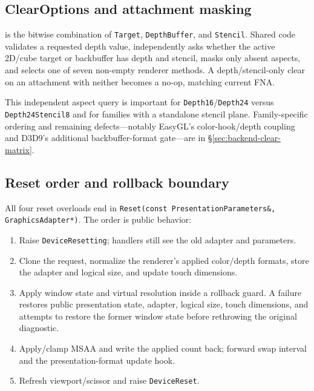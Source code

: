 \subsection{ClearOptions and attachment masking}
\label{sec:clearoptions}

 is the bitwise combination of \texttt{Target}, \texttt{DepthBuffer}, and
\texttt{Stencil}. Shared code validates a requested depth value, independently asks whether the
active 2D/cube target or backbuffer has depth and stencil, masks only absent aspects, and selects
one of seven non-empty renderer methods. A depth/stencil-only clear on an attachment with neither
becomes a no-op, matching current FNA.

This independent aspect query is important for \texttt{Depth16}/\texttt{Depth24} versus
\texttt{Depth24Stencil8} and for families with a standalone stencil plane. Family-specific
ordering and remaining defects---notably EasyGL's color-hook/depth coupling and D3D9's additional
backbuffer-format gate---are in \S\ref{sec:backend-clear-matrix}.

\subsection{Reset order and rollback boundary}
\label{sec:graphicsdevice-reset-order}

All four reset overloads end in
\texttt{Reset(const PresentationParameters\&, GraphicsAdapter*)}. The order is public behavior:

\begin{enumerate}
  \item Raise \texttt{DeviceResetting}; handlers still see the old adapter and parameters.
  \item Clone the request, normalize the renderer's applied color/depth formats, store the
        adapter and logical size, and update touch dimensions.
  \item Apply window state and virtual resolution inside a rollback guard. A failure restores
        public presentation state, adapter, logical size, touch dimensions, and attempts to
        restore the former window state before rethrowing the original diagnostic.
  \item Apply/clamp MSAA and write the applied count back; forward swap interval and the
        presentation-format update hook.
  \item Refresh viewport/scissor and raise \texttt{DeviceReset}.
\end{enumerate}

